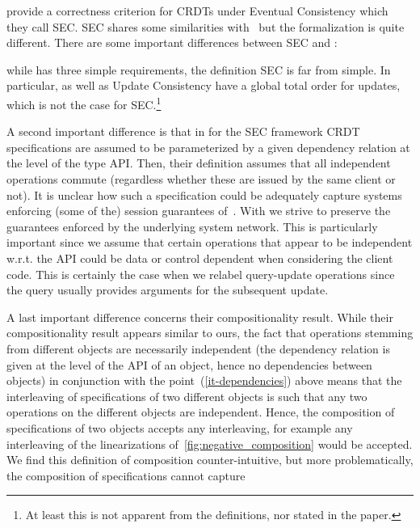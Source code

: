 \citet{JagadeesanR18} provide a correctness criterion for CRDTs under
Eventual Consistency which they call SEC.
%
SEC shares some similarities with~\cite{PerrinMJ14} but the
formalization is quite different.
There are some important differences between SEC and \CRDTLinshort{}:
\begin{inparaenum}
\item while \CRDTLinshort{} has three simple requirements, the
  definition SEC is far from simple.
  In particular, \CRDTLinshort{} as well as Update Consistency have a
  global total order for updates, which is not the case for
  SEC.\footnote{At least this is not apparent from the definitions, nor
    stated in the paper.}
\item
  \label{it-dependencies}
  A second important difference is that in for the SEC framework CRDT
  specifications are assumed to be parameterized by a given dependency
  relation at the level of the type API.
  Then, their definition assumes that all independent operations
  commute (regardless whether these are issued by the same client or
  not).
  It is unclear how such a specification could be adequately capture
  systems enforcing (some of the) session guarantees
  of~\cite{TerryDPSTW94}.
  With \CRDTLinshort{} we strive to preserve the guarantees enforced by the
  underlying system network.
  This is particularly important since we assume that certain
  operations that appear to be independent w.r.t. the API could be
  data or control dependent when considering the client code.
  This is certainly the case when we relabel query-update operations
  since the query usually provides arguments for the subsequent
  update.
\item A last important difference concerns their compositionality
  result.
  While their compositionality result appears similar to ours, the
  fact that operations stemming from different objects are necessarily
  independent (the dependency relation is given at the level of the API
  of an object, hence no dependencies between objects) in conjunction
  with the point~(\ref{it-dependencies}) above means that the interleaving
  of specifications of two different objects is such that any two
  operations on the different objects are independent.
  Hence, the composition of specifications of two objects accepts any
  interleaving, for example any interleaving of the linearizations
  of~\autoref{fig:negative_composition} would be accepted.
  We find this definition of composition counter-intuitive, but more
  problematically, the composition of specifications cannot capture

\end{inparaenum}
